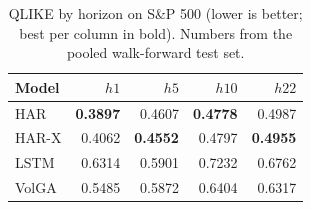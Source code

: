 \begin{table}[t]
\centering
\caption{QLIKE by horizon on S\&P 500 (lower is better; best per column in bold). Numbers from the pooled walk-forward test set.}
\label{tab:qlike_sp500_clean}
\begin{tabular}{lrrrr}
\toprule
Model & $h1$ & $h5$ & $h10$ & $h22$ \\
\midrule
HAR & \textbf{0.3897} & 0.4607 & \textbf{0.4778} & 0.4987 \\
HAR-X & 0.4062 & \textbf{0.4552} & 0.4797 & \textbf{0.4955} \\
LSTM & 0.6314 & 0.5901 & 0.7232 & 0.6762 \\
VolGA & 0.5485 & 0.5872 & 0.6404 & 0.6317 \\
\bottomrule
\end{tabular}
\end{table}

